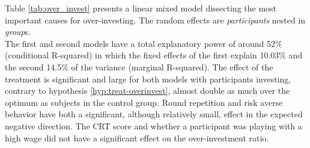 Table \ref{tab:over_invest} presents a linear mixed model dissecting the most important causes for over-investing. The random effects are \textit{participants} nested in \textit{group}s.\\

The first and second models have a total explanatory power of around 52\% (conditional R-squared) in which the fixed effects of the first explain 10.03\% and the second 14.5\% of the variance (marginal R-squared). The effect of the treatment is significant and large for both models with participants investing, contrary to hypothesis \ref{hyp:treat-overinvest}, almost double as much over the optimum as subjects in the control group. Round repetition and risk averse behavior have both a significant, although relatively small, effect in the expected negative direction. The CRT score and whether a participant was playing with a high wage did not have a significant effect on the over-investment ratio.\\

